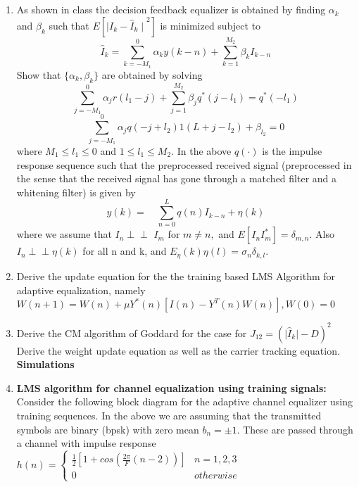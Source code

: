 \documentclass[journal,12pt,twocolumn]{IEEEtran}
\begin{document}
\section{}
\begin{enumerate}
\item As shown in class the decision feedback equalizer is obtained by finding $\alpha_k $ and $ \beta_k$ such that
$E[{\mid{I_k}-{\hat{I}_k}\mid}^2]$ is minimized
%
subject to
$${\hat{I}}_k=\sum_{k={-M_1}}^0{\alpha_k}y(k-n)+\sum_{k=1}^{M_2}{\beta_k}{I_{k-n}}$$
%
Show that $\{\alpha_k,\beta_k\}$ are obtained by solving
%
$$\sum_{j=-{M_1}}^{0}{\alpha_j}r(l_1-j)+\sum_{j=1}^{M_2}{\beta_j}q^*(j-l_1)=q^*(-l_1)$$
%
$$\sum_{j=-{M_1}}^{0}{\alpha_j}q(-j+l_2)1(L+j-l_2)+\beta_{l_2}=0$$
%
where $M_1\leq {l_1}\leq 0$ and $1\leq{l_1}\leq M_2.$
In the above $q(\cdot)$ is the impulse response sequence such that the preprocessed received signal (preprocessed in the
sense that the received signal has gone through a matched filter and a whitening filter) is given by
%
$$y(k)= \quad\sum_{n=0}^{L}q(n)I_{k-n}+\eta(k)$$
%
where we assume that $I_n \perp\!\!\!\perp $ $I_m$ for $m \neq n,$ and $E[I_nI_m^{*}]=\delta_{m,n}.$ Also $I_n \perp\!\!\!\perp \eta(k)$ for all n and k, and $E_\eta(k)\eta(l)=\sigma_n\delta_{k,l}.$   
%
\item Derive the update equation for the the training based LMS Algorithm for adaptive equalization, namely
%
$W(n+1)=W(n)+\mu {Y^*(n)}[I(n)-Y^T(n)W(n)],W(0)=0$
%
\item Derive the CM algorithm of Goddard for the case for
%
$J_{12}={(\vert\hat{I}_k\vert -D)}^2$
Derive the weight update equation as well as the carrier tracking equation.
\textbf{Simulations}
\item \textbf{LMS algorithm for channel equalization using training signals:}
Consider the following block diagram for the adaptive channel equalizer using training sequences.
%
%
In the above we are assuming that the transmitted symbols are binary (bpsk) with zero mean $b_n=\pm 1$. These are passed through a channel with impulse response
%
$h(n)=\begin{cases}
\frac{1}{2}[1+cos(\frac{2\pi}{F}{(n-2)})]& n=1,2,3
\\
0 & otherwise
\end{cases}$
%
\begin{center}
\begin{figure}
\centering

\end{figure}
\end{center}
\end{enumerate}
\end{document}
